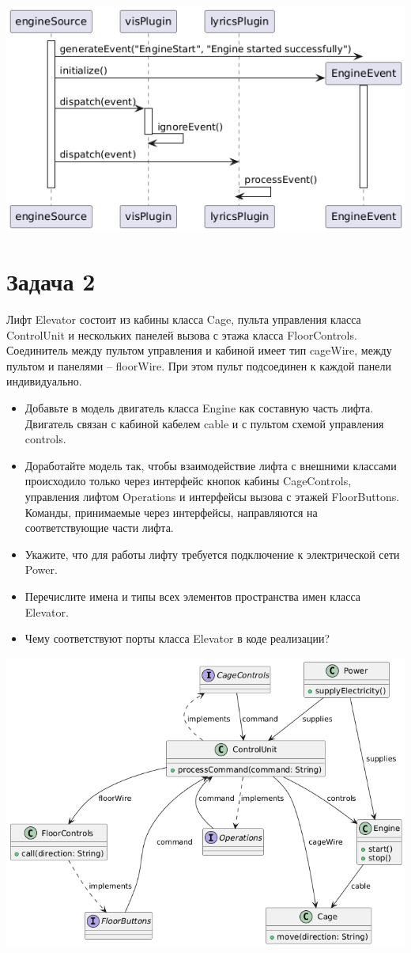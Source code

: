 \documentclass{article}
\begin{document}
\includegraphics[width=\textwidth]{1_2.png}

\section{Задача 2}
Лифт Elevator состоит из кабины класса Cage, пульта управления класса ControlUnit и нескольких панелей вызова с этажа класса FloorControls. Соединитель между пультом управления и кабиной имеет тип cageWire, между пультом и панелями – floorWire. При этом пульт подсоединен к каждой панели индивидуально.

\begin{itemize}
    \item Добавьте в модель двигатель класса Engine как составную часть лифта. Двигатель связан с кабиной кабелем cable и с пультом схемой управления controls.
    \item Доработайте модель так, чтобы взаимодействие лифта с внешними классами происходило только через интерфейс кнопок кабины CageControls, управления лифтом Operations и интерфейсы вызова с этажей FloorButtons. Команды, принимаемые через интерфейсы, направляются на соответствующие части лифта.
    \item Укажите, что для работы лифту требуется подключение к электрической сети Power.
    \item Перечислите имена и типы всех элементов пространства имен класса Elevator.
    \item Чему соответствуют порты класса Elevator в коде реализации?
\end{itemize}

\includegraphics[width=\textwidth]{2.png}
\end{document}
